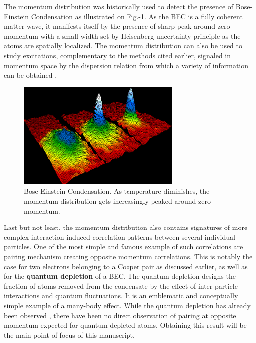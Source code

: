 The momentum distribution was historically \cite{anderson1995observation} used to detect the presence of Bose-Einstein Condensation as illustrated on Fig.-\ref{fig:1st_BEC}. As the BEC is a fully coherent matter-wave, it manifests itself by the presence of sharp peak around zero momentum with a small width set by Heisenberg uncertainty principle as the atoms are spatially localized. The momentum distribution can also be used to study excitations, complementary to the methods cited earlier, signaled in momentum space by the dispersion relation from which a variety of information can be obtained \cite{clement2009exploring,ozeri2005colloquium,sagi2012measurement}.


\begin{figure}
    \centering
    \includegraphics[width=0.7\textwidth]{Fig/Intro/BEC.png}
    \caption[Momentum distribution across Bose-Einstein Condensation]{Bose-Einstein Condensation. As temperature diminishes, the momentum distribution gets increasingly peaked around zero momentum.}
    \label{fig:1st_BEC}
\end{figure}


Last but not least, the momentum distribution also contains signatures of more complex interaction-induced correlation patterns between several individual particles. One of the most simple and famous example of such correlations are pairing mechanism creating opposite momentum correlations. This is notably the case for two electrons belonging to a Cooper pair as discussed earlier, as well as for the \textbf{quantum depletion} of a BEC. The quantum depletion designs the fraction of atoms removed from the condensate by the effect of inter-particle interactions and quantum fluctuations. It is an emblematic and conceptually simple example of a many-body effect. While the quantum depletion has already been observed \cite{chang2016,lopes2017,xu2006}, there have been no direct observation of pairing at opposite momentum expected for quantum depleted atoms. Obtaining this result will be the main point of focus of this manuscript.

